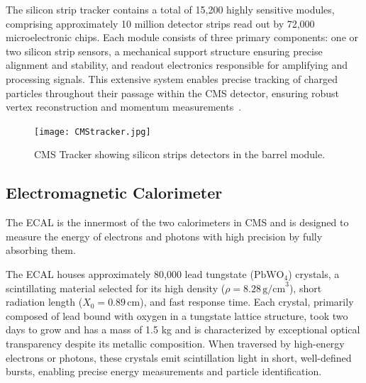The silicon strip tracker contains a total of 15,200 highly sensitive modules, comprising approximately 10 million detector strips read out by 72,000 microelectronic chips. Each module consists of three primary components: one or two silicon strip sensors, a mechanical support structure ensuring precise alignment and stability, and readout electronics responsible for amplifying and processing signals. This extensive system enables precise tracking of charged particles throughout their passage within the CMS detector, ensuring robust vertex reconstruction and momentum measurements~\cite{CMS:trackingPerf}.




\begin{figure}[!hbt]
    \begin{center}
        \texttt{[image: CMStracker.jpg]}
        \caption{CMS Tracker showing silicon strips detectors in the barrel module.}
        \label{fig:CMStracker}
    \end{center}
\end{figure}

\subsection{Electromagnetic Calorimeter}

The ECAL is the innermost of the two calorimeters in CMS and is designed to measure the energy of electrons and photons with high precision by fully absorbing them.

The ECAL houses approximately 80,000 lead tungstate (\(\text{PbWO}_4\)) crystals, a scintillating material selected for its high density (\(\rho = 8.28 \, \text{g/cm}^3\)), short radiation length (\(X_0 = 0.89 \, \text{cm}\)), and fast response time. Each crystal, primarily composed of lead bound with oxygen in a tungstate lattice structure, took two days to grow and has a mass of 1.5 kg and is characterized by exceptional optical transparency despite its metallic composition. When traversed by high-energy electrons or photons, these crystals emit scintillation light in short, well-defined bursts, enabling precise energy measurements and particle identification.

